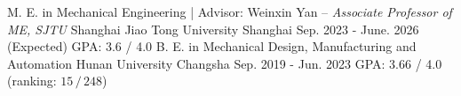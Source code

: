 \begin{cventries}
    \vspace{-0.5mm}
	\cventry
	{M. E. in Mechanical Engineering | Advisor: Weinxin Yan -- \textit{Associate Professor of ME, SJTU}} %
	{Shanghai Jiao Tong University} %
	{Shanghai} %
	{Sep. 2023 - June. 2026 (Expected)} %
	{
        GPA: 3.6 / 4.0
	}%
	\vspace{3mm} 
	\cventry
	{B. E. in Mechanical Design, Manufacturing and Automation} %
	{Hunan University} %
	{Changsha} %
	{Sep. 2019 - Jun. 2023} %
	{
        GPA: 3.66 / 4.0 (ranking: $15 \, / \, 248$)
	}%
    \vspace{5.5mm}
\end{cventries}
